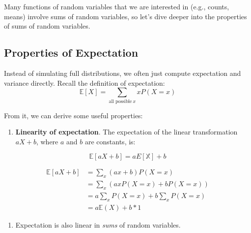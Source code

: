 \documentclass[
  letterpaper,
  DIV=11,
  numbers=noendperiod]{scrreprt}
\providecommand{\tightlist}{%
  \setlength{\itemsep}{0pt}\setlength{\parskip}{0pt}}\usepackage{longtable,booktabs,array}
\begin{document}
Many functions of random variables that we are interested in (e.g.,
counts, means) involve sums of random variables, so let's dive deeper
into the properties of sums of random variables.

\subsection{Properties of Expectation}\label{properties-of-expectation}

Instead of simulating full distributions, we often just compute
expectation and variance directly. Recall the definition of expectation:
\[\mathbb{E}[X] = \sum_{\text{all possible}\ x} x P(X=x)\]

From it, we can derive some useful properties:

\begin{enumerate}
\def\labelenumi{\arabic{enumi}.}
\tightlist
\item
  \textbf{Linearity of expectation}. The expectation of the linear
  transformation \(aX+b\), where \(a\) and \(b\) are constants, is:
\end{enumerate}

\[\mathbb{E}[aX+b] = aE[\mathbb{X}] + b\]

\begin{tcolorbox}[enhanced jigsaw, colback=white, arc=.35mm, toprule=.15mm, colframe=quarto-callout-tip-color-frame, coltitle=black, opacitybacktitle=0.6, breakable, titlerule=0mm, leftrule=.75mm, left=2mm, opacityback=0, bottomtitle=1mm, rightrule=.15mm, colbacktitle=quarto-callout-tip-color!10!white, bottomrule=.15mm, title=\textcolor{quarto-callout-tip-color}{\faLightbulb}\hspace{0.5em}{Proof}, toptitle=1mm]

\[\begin{align}
        \mathbb{E}[aX+b] &= \sum_{x} (ax + b) P(X=x) \\
        &= \sum_{x} (ax P(X=x) + bP(X=x)) \\
        &= a\sum_{x}P(X=x) + b\sum_{x}P(X=x)\\
        &= a\mathbb{E}(X) + b * 1
    \end{align}\]

\end{tcolorbox}

\begin{enumerate}
\def\labelenumi{\arabic{enumi}.}
\setcounter{enumi}{1}
\tightlist
\item
  Expectation is also linear in \emph{sums} of random variables.
\end{enumerate}
\end{document}
